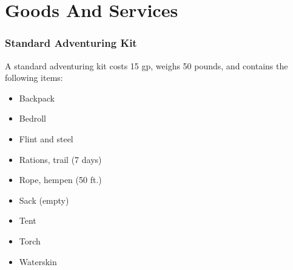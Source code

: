\section{Goods And Services}

    \subsubsection{Standard Adventuring Kit}
        A standard adventuring kit costs 15 gp, weighs 50 pounds, and contains the following items:
        \begin{itemize}
            \item Backpack
            \item Bedroll
            \item Flint and steel
            \item Rations, trail (7 days)
            \item Rope, hempen (50 ft.)
            \item Sack (empty)
            \item Tent
            \item Torch
            \item Waterskin
        \end{itemize}

